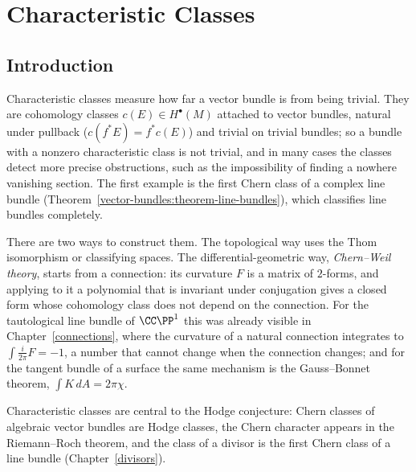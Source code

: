 \chapter{Characteristic Classes}\label{characteristic-classes}

\section{Introduction}\label{characteristic-classes:section-introduction}

Characteristic classes measure how far a vector bundle is from being trivial. They are cohomology classes $c(E) \in H^\bullet(M)$ attached to vector bundles, natural
under pullback ($c(f^*E) = f^*c(E)$) and trivial on trivial bundles; so a bundle with a nonzero characteristic class is not trivial, and in many cases the classes detect
more precise obstructions, such as the impossibility of finding a nowhere vanishing section. The first example is the first Chern class of a complex line bundle
(Theorem~\ref{vector-bundles:theorem-line-bundles}), which classifies line bundles completely.

There are two ways to construct them. The topological way uses the Thom isomorphism or classifying spaces. The differential-geometric way, \emph{Chern--Weil theory}, starts
from a connection: its curvature $F$ is a matrix of $2$-forms, and applying to it a polynomial that is invariant under conjugation gives a closed form whose cohomology class
does not depend on the connection. For the tautological line bundle of $\CC\PP^1$ this was already visible in Chapter~\ref{connections}, where the curvature of a natural
connection integrates to $\int\frac{i}{2\pi}F = -1$, a number that cannot change when the connection changes; and for the tangent bundle of a surface the same mechanism
is the Gauss--Bonnet theorem, $\int K\,dA = 2\pi\chi$.

Characteristic classes are central to the Hodge conjecture: Chern classes of algebraic vector bundles are Hodge classes, the Chern character appears in the Riemann--Roch
theorem, and the class of a divisor is the first Chern class of a line bundle (Chapter~\ref{divisors}).

